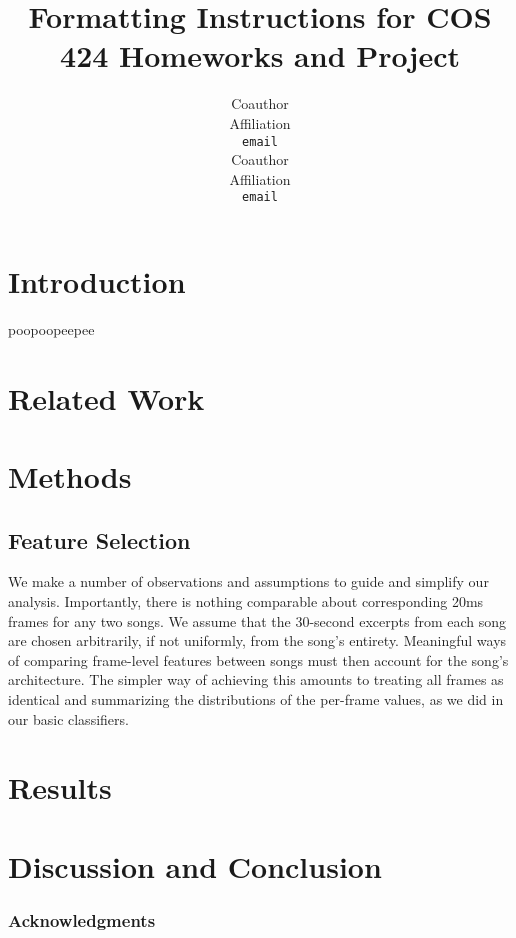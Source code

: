 \documentclass{article} %
\title{Formatting Instructions for COS 424 Homeworks and Project}
\author{
Coauthor\\
Affiliation\\
\texttt{email} \\
Coauthor \\
Affiliation \\
\texttt{email} \\
}
\begin{document}
\maketitle

\begin{abstract}

\end{abstract}

\section{Introduction}

poopoopeepee

\section{Related Work}

\section{Methods}

\subsection{Feature Selection}
We make a number of observations and assumptions to guide and simplify our analysis.  Importantly, there is nothing comparable about corresponding 20ms frames for any two songs.  We assume that the 30-second excerpts from each song are chosen arbitrarily, if not uniformly, from the song's entirety.  Meaningful ways of comparing frame-level features between songs must then account for the song's architecture.  The simpler way of achieving this amounts to treating all frames as identical and summarizing the distributions of the per-frame values, as we did in our basic classifiers.

\section{Results}

\section{Discussion and Conclusion}

\subsubsection*{Acknowledgments}



\end{document}

